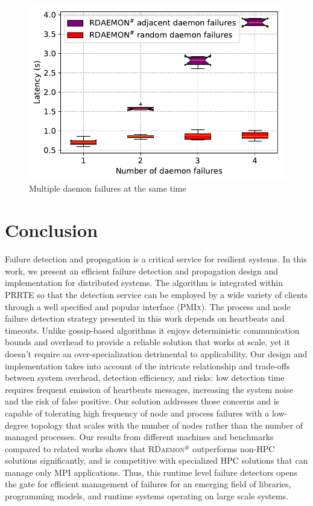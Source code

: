 \documentclass[sigconf]{acmart}
\newcommand{\prrte}[0]{\textsc{PRRTE}\xspace}
\newcommand{\pmix}[0]{\textsc{PMIx}\xspace}
\newcommand{\mpi}[0]{\textsc{MPI}\xspace}
\newcommand{\ourwork}[0]{\textsc{RDaemon}\ensuremath{^\#}\xspace}
\begin{document}
\begin{figure}[h]
  \centering
  \includegraphics[width=\linewidth]{multi_daemon_failures.pdf}
  \caption{Multiple daemon failures at the same time}
  \label{fig:multi_daemon_failure_nacl}
\end{figure}


\section{Conclusion}\label{sec:conclusion}
Failure detection and propagation is a critical service for resilient systems. In this work, we present an efficient failure detection and propagation design and implementation for distributed systems.
The algorithm is integrated within \prrte so that the detection service
can be employed by a wide variety of clients through a well specified and
popular interface (\pmix). The process and node failure detection strategy presented in this work depends on heartbeats and timeouts. Unlike gossip-based algorithms
it enjoys deterministic communication bounds and overhead to provide a reliable solution that works at scale,
yet it doesn't require an over-specialization detrimental to applicability.
Our design and implementation takes into account of the intricate relationship and trade-offs between system overhead, detection efficiency, and risks: low detection time requires frequent emission of heartbeats messages, increasing the system noise and the risk of false positive. Our solution addresses those concerns and is capable of tolerating high frequency of node and process failures with a low-degree
topology that scales with the number of nodes rather than the number of
managed processes. Our results from different machines and benchmarks
compared to related works shows that \ourwork outperforms non-HPC solutions
significantly, and is competitive with specialized HPC solutions that can
manage only \mpi applications. Thus, this runtime level failure detectors
opens the gate for efficient management of failures for an emerging field
of libraries, programming models, and runtime systems operating on large scale systems.
\end{document}
